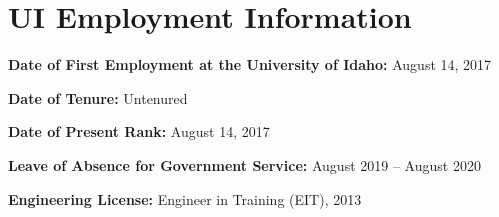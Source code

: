 \section{UI Employment Information}
\resumeSubHeadingListStart
    \item \textbf{Date of First Employment at the University of Idaho: }August 14, 2017\\\vspace{-1.5mm}
    \item \textbf{Date of Tenure: } Untenured \\\vspace{-1.5mm}
    \item \textbf{Date of Present Rank: }August 14, 2017 \\\vspace{-1.5mm}
    \item \textbf{Leave of Absence for Government Service:} August 2019 -- August 2020\\\vspace{-1.5mm}
    \item \textbf{Engineering License: }Engineer in Training (EIT), 2013\\\vspace{-1mm}
\resumeSubHeadingListEnd